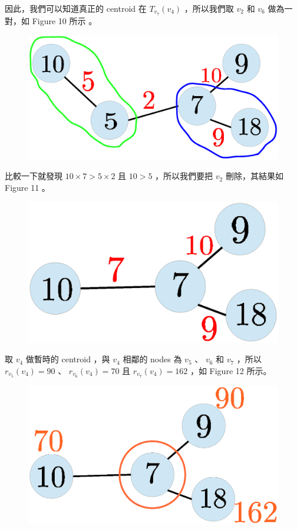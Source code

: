 \documentclass[12pt]{article}
\begin{document}
\begin{CJK}{UTF8}{bkai}
因此，我們可以知道真正的 centroid 在 $T_{v_7}(v_4)$ ，所以我們取 $v_2$ 和 $v_6$ 做為一對，如 Figure 10 所示 。

\begin{figure}[H]
\centering
\includegraphics[scale=0.3]{fig10.eps}
\caption{}
\end{figure}

比較一下就發現 $10 \times 7 > 5 \times 2$ 且 $10 > 5$ ，所以我們要把 $v_2$ 刪除，其結果如 Figure 11 。

\begin{figure}[H]
\centering
\includegraphics[scale=0.3]{fig11.eps}
\caption{}
\end{figure}

取 $v_4$ 做暫時的 centroid ，與 $v_4$ 相鄰的 nodes 為 $v_5$ 、 $v_6$ 和 $v_7$ ，所以 $r_{v_5}(v_4)=90$ 、 $r_{v_6}(v_4)=70$
且 $r_{v_7}(v_4)=162$ ，如 Figure 12 所示。

\begin{figure}[H]
\centering
\includegraphics[scale=0.3]{fig12.eps}
\caption{}
\end{figure}


\end{CJK}
\end{document}
